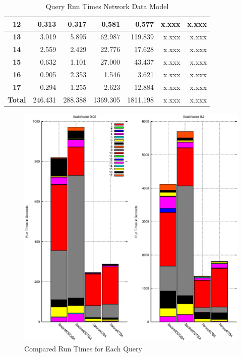 \documentclass[a4paper]{article}
\begin{document}
{\begin{table}
\begin{scriptsize}
\begin{center}
\begin{tabular}{|c|r|r|r|r|r|r|}
\hline
\textbf{12}&0,313&0.317&0,581&0,577&x.xxx&x.xxx\\
\hline
\textbf{13}&3.019&5.895&62.987&119.839&x.xxx&x.xxx\\
\hline
\textbf{14}&2.559&2.429&22.776&17.628&x.xxx&x.xxx\\
\hline
\textbf{15}&0.632&1.101&27.000&43.437&x.xxx&x.xxx\\
\hline
\textbf{16}&0.905&2.353&1.546&3.621&x.xxx&x.xxx\\
\hline
\textbf{17}&0.294&1.255&2.623&12.884&x.xxx&x.xxx\\
\hline
\textbf{Total}&246.431&288.388&1369.305&1811.198&x.xxx&x.xxx\\
\hline
\end{tabular}
\end{center}
\end{scriptsize}
\caption{Query Run Times Network Data Model}
\label{tab:rtnet}
\end{table}
\begin{figure}
\begin{center}
	\includegraphics[width=17.0cm]{compruntimesall.eps}
	\caption{Compared Run Times for Each Query}
	\label{fig:compruntimesall}
\end{center}
\end{figure}

}
\end{document}
